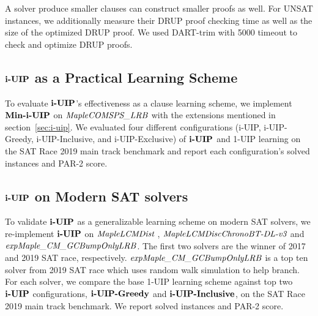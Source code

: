 A solver produce smaller clauses can construct smaller proofs as well. For UNSAT instances, we additionally measure their DRUP\cite{} proof checking time as well as the size of the optimized DRUP proof. We used DART-trim \cite{} with 5000 timeout to check and optimize DRUP proofs. 



\subsection{$\textbf{i-UIP}$ as a Practical Learning Scheme}
To evaluate $\textbf{i-UIP}$'s effectiveness as a clause learning scheme, we implement $\textbf{Min-i-UIP}$ on $\textit{MapleCOMSPS\_LRB}$ with the extensions mentioned in section~\ref{sec:i-uip}. We evaluated four different configurations (i-UIP, i-UIP-Greedy, i-UIP-Inclusive, and i-UIP-Exclusive) of $\textbf{i-UIP}$ and 1-UIP learning on the SAT Race 2019 main track benchmark and report each configuration's solved instances and PAR-2 score. 



\subsection{$\textbf{i-UIP}$ on Modern SAT solvers}
To validate $\textbf{i-UIP}$ as a generalizable learning scheme on modern SAT solvers, we re-implement $\textbf{i-UIP}$ on $\textit{MapleLCMDist}$ \cite{},  $\textit{MapleLCMDiscChronoBT-DL-v3}$ \cite{} and $\textit{expMaple\_CM\_GCBumpOnlyLRB}$.  
The first two solvers are the winner of 2017 and 2019 SAT race, respectively.  $\textit{expMaple\_CM\_GCBumpOnlyLRB}$ is a top ten solver from 2019 SAT race which uses random walk simulation to help branch. For each solver, we compare the base 1-UIP learning scheme against top two $\textbf{i-UIP}$ configurations, $\textbf{i-UIP-Greedy}$ and $\textbf{i-UIP-Inclusive}$, on the SAT Race 2019 main track benchmark. We report solved instances and PAR-2 score.


